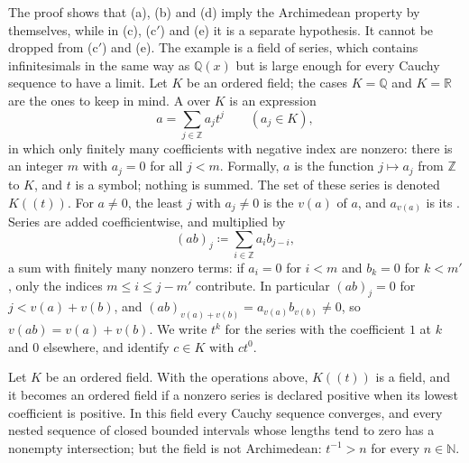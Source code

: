 The proof shows that (a), (b) and (d) imply the Archimedean property by themselves, while in (c), (c$'$) and (e) it is a separate hypothesis. It cannot be dropped from (c$'$) and (e). The example is a field of series, which contains infinitesimals in the same way as $\mathbb Q(x)$ but is large enough for every Cauchy sequence to have a limit. Let $K$ be an ordered field; the cases $K=\mathbb Q$ and $K=\mathbb R$ are the ones to keep in mind. A  over $K$ is an expression
\[
a=\sum_{j\in\mathbb Z}a_jt^j\qquad(a_j\in K),
\]
in which only finitely many coefficients with negative index are nonzero: there is an integer $m$ with $a_j=0$ for all $j<m$. Formally, $a$ is the function $j\mapsto a_j$ from $\mathbb Z$ to $K$, and $t$ is a symbol; nothing is summed. The set of these series is denoted $K((t))$. For $a\ne0$, the least $j$ with $a_j\ne0$ is the  $v(a)$ of $a$, and $a_{v(a)}$ is its . Series are added coefficientwise, and multiplied by
\[
(ab)_j\coloneqq\sum_{i\in\mathbb Z}a_ib_{j-i},
\]
a sum with finitely many nonzero terms: if $a_i=0$ for $i<m$ and $b_k=0$ for $k<m'$, only the indices $m\le i\le j-m'$ contribute. In particular $(ab)_j=0$ for $j<v(a)+v(b)$, and $(ab)_{v(a)+v(b)}=a_{v(a)}b_{v(b)}\ne0$, so $v(ab)=v(a)+v(b)$. We write $t^k$ for the series with the coefficient $1$ at $k$ and $0$ elsewhere, and identify $c\in K$ with $ct^0$.

\begin{theorem}
\label{thm:laurent-complete}
Let $K$ be an ordered field. With the operations above, $K((t))$ is a field, and it becomes an ordered field if a nonzero series is declared positive when its lowest coefficient is positive. In this field every Cauchy sequence converges, and every nested sequence of closed bounded intervals whose lengths tend to zero has a nonempty intersection; but the field is not Archimedean: $t^{-1}>n$ for every $n\in\mathbb N$.
\end{theorem}

